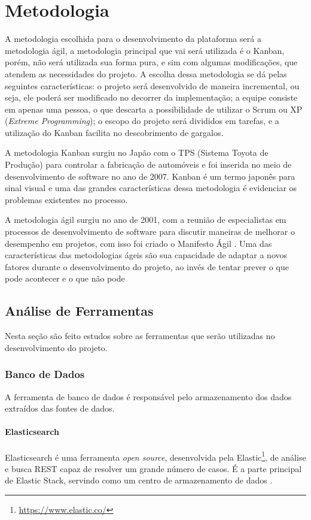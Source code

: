 \chapter[Metodologia]{Metodologia}
A metodologia escolhida para o desenvolvimento da plataforma será a metodologia ágil, a metodologia principal que vai será utilizada é o Kanban, porém, não será utilizada sua forma pura, e sim com algumas modificações, que atendem as necessidades do projeto. A escolha dessa metodologia se dá pelas seguintes características: o projeto será desenvolvido de maneira incremental, ou seja, ele poderá ser modificado no decorrer da implementação; a equipe consiste em apenas uma pessoa, o que descarta a possibilidade de utilizar o Scrum ou XP (\textit{Extreme Programming}); o escopo do projeto será divididos em tarefas, e a utilização do Kanban facilita no descobrimento de gargalos.

A metodologia Kanban surgiu no Japão com o TPS (Sistema Toyota de Produção) \cite{tps} para controlar a fabricação de automóveis e foi inserida no meio de desenvolvimento de software no ano de 2007. Kanban é um termo japonês para sinal visual e uma das grandes características dessa metodologia é evidenciar os problemas existentes no processo. 

A metodologia ágil surgiu no ano de 2001, com a reunião de especialistas em processos de desenvolvimento de software para discutir maneiras de melhorar o desempenho em projetos, com isso foi criado o Manifesto Ágil \cite{agil}. Uma das características das metodologias ágeis são sua capacidade de adaptar a novos fatores durante o desenvolvimento do projeto, ao invés de tentar prever o que pode acontecer e o que não pode

\section{Análise de Ferramentas}
Nesta seção são feito estudos sobre as ferramentas que serão utilizadas no desenvolvimento do projeto.
\subsection{Banco de Dados}
A ferramenta de banco de dados é responsável pelo armazenamento dos dados extraídos das fontes de dados.
\subsubsection*{Elasticsearch}
Elasticsearch é uma ferramenta \textit{open source}, desenvolvida pela Elastic\footnote[1]{\url{https://www.elastic.co/}}, de análise e busca REST capaz de resolver um grande número de casos. É a parte principal de Elastic Stack, servindo como um centro de armazenamento de dados \cite{elasticsearch}.

